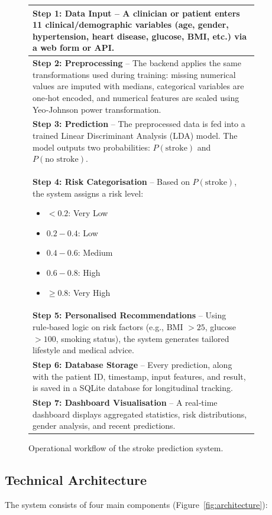 \documentclass[12pt,a4paper]{article}
\begin{document}
\begin{figure}[H]
\centering
\begin{tabular}{|p{0.9\linewidth}|}
\hline
\textbf{Step 1: Data Input} – A clinician or patient enters 11 clinical/demographic variables (age, gender, hypertension, heart disease, glucose, BMI, etc.) via a web form or API. \\
\hline
\textbf{Step 2: Preprocessing} – The backend applies the same transformations used during training: missing numerical values are imputed with medians, categorical variables are one‑hot encoded, and numerical features are scaled using Yeo‑Johnson power transformation. \\
\hline
\textbf{Step 3: Prediction} – The preprocessed data is fed into a trained Linear Discriminant Analysis (LDA) model. The model outputs two probabilities: \(P(\text{stroke})\) and \(P(\text{no stroke})\). \\
\hline
\textbf{Step 4: Risk Categorisation} – Based on \(P(\text{stroke})\), the system assigns a risk level:
\begin{itemize}
    \item \(<0.2\): Very Low
    \item \(0.2-0.4\): Low
    \item \(0.4-0.6\): Medium
    \item \(0.6-0.8\): High
    \item \(\geq 0.8\): Very High
\end{itemize} \\
\hline
\textbf{Step 5: Personalised Recommendations} – Using rule‑based logic on risk factors (e.g., BMI \(>25\), glucose \(>100\), smoking status), the system generates tailored lifestyle and medical advice. \\
\hline
\textbf{Step 6: Database Storage} – Every prediction, along with the patient ID, timestamp, input features, and result, is saved in a SQLite database for longitudinal tracking. \\
\hline
\textbf{Step 7: Dashboard Visualisation} – A real‑time dashboard  displays aggregated statistics, risk distributions, gender analysis, and recent predictions. \\
\hline
\end{tabular}
\caption{Operational workflow of the stroke prediction system.}
\label{fig:workflow}
\end{figure}

\subsection{Technical Architecture}
The system consists of four main components (Figure~\ref{fig:architecture}):
\end{document}
